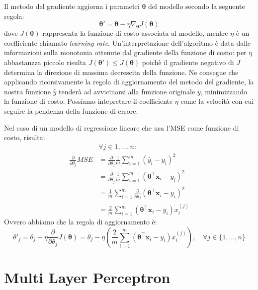\documentclass{standalone}
\begin{document}
Il metodo del gradiente aggiorna i parametri $\bm \theta$ del modello secondo
la seguente regola: 
$$ \bm \theta' = \bm \theta - \eta \nabla_{\bm \theta} J(\bm \theta) $$
dove $J(\bm \theta)$ rappresenta la funzione di costo associata al modello,
mentre $\eta$ è un coefficiente chiamato \emph{learning rate}.
Un'interpretazione dell'algoritmo è data dalle informazioni sulla monotonia
ottenute dal gradiente della funzione di costo: per $\eta$ abbastanzza piccolo
risulta $J(\bm \theta') \leq J(\bm \theta)$ poichè il gradiente negativo di $J$
determina la direzione di massima decrescita della funzione\cite{goodfellow}.
Ne consegue che applicando ricorsivamente la regola di aggiornamento del metodo
del gradiente, la nostra funzione $\hat{y}$ tenderà ad avvicinarsi alla
funzione originale $y$, minimizzando la funzione di costo.
Possiamo intepretare il coefficiente $\eta$ come la velocità con cui seguire la
pendenza della funzione di errore.

Nel caso di un modello di regressione lineare che usa l'MSE come funzione di
costo, risulta: 
\begin{align*}
  &\forall j \in {1, \dotsc, n}: \\
  \frac{\partial}{\partial\theta_j} MSE
  &= 
  \frac{\partial}{\partial\theta_j} \frac{1}{m} \sum_{i=1}^m{(\hat{y}_i -
    y_i)^2} \\ 
  &= \frac{\partial}{\partial\theta_j} \frac{1}{m}
  \sum_{i=1}^m{(\bm \theta^\intercal \bm x_i - y_i)^2} \\
  &= \frac{1}{m}
  \sum_{i=1}^m{\frac{\partial}{\partial\theta_j}(\bm \theta^\intercal \bm x_i -
    y_i)^2} \\
  &= \frac{2}{m}
  \sum_{i=1}^m{(\bm \theta^\intercal \bm x_i - y_i)x_i^{(j)}}
\end{align*}
%
Ovvero abbiamo che la regola di aggiornamento è:
$$ \theta'_j = \theta_j - \eta \frac{\partial}{\partial\theta_j} J(\bm \theta)
             = \theta_j - \eta (\frac{2}{m} 
             \sum_{i=1}^m{(\bm \theta^\intercal \bm x_i - y_i)x_i^{(j)}}),
             \quad \forall j \in \{1, \dotsc, n\}
$$




\section{Multi Layer Perceptron}
\end{document}
